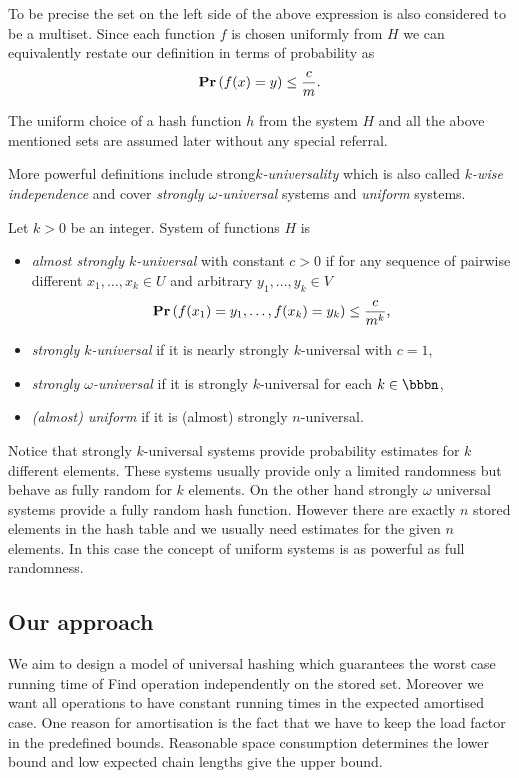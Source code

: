 \documentclass[runningheads,a4paper]{llncs}
\begin{document}
To be precise the set on the left side of the above expression is also considered to be a multiset. Since each function $f$ is chosen uniformly from $H$ we can equivalently restate our definition in terms of probability as
\[
\mathbf{Pr}\left(f(x) = y\right) \leq \frac{c}{m}.
\]

The uniform choice of a hash function $h$ from the system $H$ and all the above mentioned sets are assumed later without any special referral.

More powerful definitions include strong\emph{$k$-universality} which is also called \emph{$k$-wise independence} and cover \emph{strongly $\omega$-universal} systems and \emph{uniform} systems.
\begin{definition}
Let $k > 0$ be an integer. System of functions $H$ is 
\begin{itemize}
	\item \emph{almost strongly $k$-universal} with constant $c > 0$ if for any sequence of pairwise different $x_1, \dots, x_k \in U$ and arbitrary $y_1, \dots, y_k \in V$ \[\mathbf{Pr}\left(f(x_1) = y_1, \dots, f(x_k) = y_k\right) \leq \frac{c}{m^k}\mbox{,}\]
	\item \emph{strongly $k$-universal} if it is nearly strongly $k$-universal with $c = 1$,
	\item \emph{strongly $\omega$-universal} if it is strongly $k$-universal for each $k \in \bbbn$,
	\item \emph{(almost) uniform} if it is (almost) strongly $n$-universal.
\end{itemize}
\end{definition}

Notice that strongly $k$-universal systems provide probability estimates for $k$ different elements. These systems usually provide only a limited randomness but behave as fully random for $k$ elements. On the other hand strongly $\omega$ universal systems provide a fully random hash function. However there are exactly $n$ stored elements in the hash table and we usually need estimates for the given $n$ elements. In this case the concept of uniform systems is as powerful as full randomness.

\subsection{Our approach}
We aim to design a model of universal hashing which guarantees the worst case running time of Find operation independently on the stored set. Moreover we want all operations to have constant running times in the expected amortised case. One reason for amortisation is the fact that we have to keep the load factor in the predefined bounds. Reasonable space consumption determines the lower bound and low expected chain lengths give the upper bound.
\end{document}
